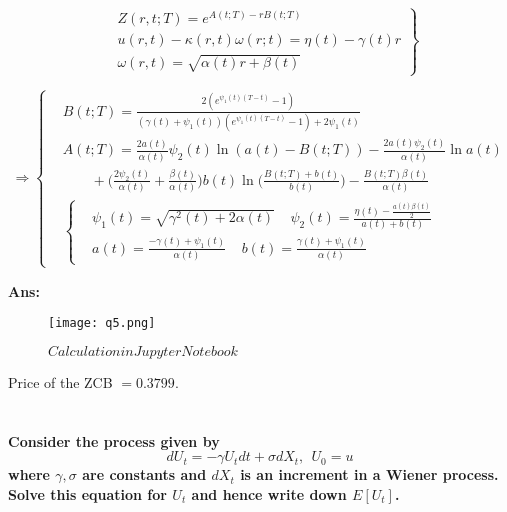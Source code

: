 \documentclass[11pt, notitlepage]{article}
\def\\ln{\mathrm{\ln}}
\def\\exp{\mathrm{\exp}}
\def\\max{\mathrm{\max}}
\begin{document}
\begin{equation*}
\left.
  \begin{aligned}
    &Z(r,t;T) = e^{A(t;T) - rB(t;T)}\\
    &u(r,t) - \kappa(r,t) \omega(r;t) = \eta(t) - \gamma(t) r\\
    &\omega(r,t) = \sqrt{\alpha(t)r + \beta(t)}
  \end{aligned} \right\}
\end{equation*}

\begin{equation*}
\Rightarrow \left \{
  \begin{aligned}
    &B(t;T)= \frac{2(e^{\psi_1 (t)(T-t)}-1)}{(\gamma(t) +\psi_1(t))(e^{\psi_1(t)(T-t)}-1)+2\psi_1(t)}\\
    &A(t;T) = \frac{2a(t)}{\alpha(t)}\psi_2(t) \ln(a(t)-B(t;T)) - \frac{2a(t)\psi_2(t)}{\alpha(t)}\ln a(t)\\
    & ~~~~~~~~~ +\bigg(\frac{2\psi _2(t)}{\alpha(t)} + \frac{\beta(t)}{\alpha(t)}\bigg) b(t) \ln \bigg(\frac{B(t;T) + b(t)}{b(t)} \bigg) - \frac{B(t;T)\beta(t)}{\alpha (t)}\\
    & \left \{ 
    \begin{aligned}
    &\psi_1(t) = \sqrt{\gamma^2(t) + 2\alpha(t)} ~~~~~ \psi_2(t) = \frac{\eta(t) - \frac{a(t)\beta(t)}{2}}{a(t) + b(t)}\\
    &a(t) = \frac{-\gamma(t) + \psi_1(t)}{\alpha(t)} ~~~~~b(t) = \frac{\gamma(t) + \psi_1(t)}{\alpha(t)}
    \end{aligned} \right.
  \end{aligned} \right. 
\end{equation*}
\mdseries

\vspace{5mm}
\color{black}
\textbf {Ans:}

\begin{figure}[h]
\centering
  \texttt{[image: q5.png]}
  \caption{$Calculation in Jupyter Notebook$}
  \label{1b}
\end{figure}
Price of the ZCB $= 0.3799$.

\newpage
\color{red}
\section{}
\bfseries
Consider the process given by 
$$ dU_t = -\gamma U_t dt + \sigma dX_t, ~~U_0 =u$$
where $\gamma, \sigma$ are constants and $dX_t$ is an increment in a Wiener process. Solve this equation for $U_t$ and hence write down $E[U_t]$.
\mdseries
\end{document}
